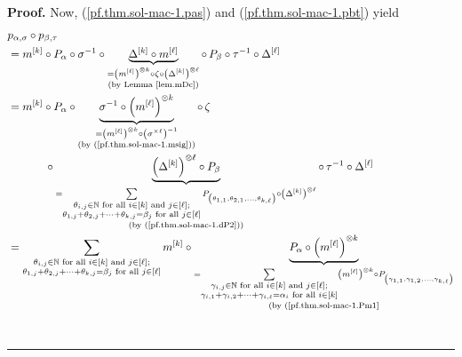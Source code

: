 \documentclass[numbers=enddot,12pt,final,onecolumn,notitlepage]{scrartcl}%
\theoremstyle{definition}
\newenvironment{proof}[1][Proof]{\noindent\textbf{#1.} }{\ \rule{0.5em}{0.5em}}
\let\sumnonlimits\sum
\renewcommand{\sum}{\sumnonlimits\limits}
\begin{document}
\begin{proof}
Now, (\ref{pf.thm.sol-mac-1.pas}) and (\ref{pf.thm.sol-mac-1.pbt}) yield%
\begin{align}
&  p_{\alpha,\sigma}\circ p_{\beta,\tau}\nonumber\\
&  =m^{\left[  k\right]  }\circ P_{\alpha}\circ\sigma^{-1}\circ
\underbrace{\Delta^{\left[  k\right]  }\circ m^{\left[  \ell\right]  }%
}_{\substack{=\left(  m^{\left[  \ell\right]  }\right)  ^{\otimes k}\circ
\zeta\circ\left(  \Delta^{\left[  k\right]  }\right)  ^{\otimes\ell
}\\\text{(by Lemma \ref{lem.mDc})}}}\circ\,P_{\beta}\circ\tau^{-1}\circ
\Delta^{\left[  \ell\right]  }\nonumber\\
&  =m^{\left[  k\right]  }\circ P_{\alpha}\circ\underbrace{\sigma^{-1}%
\circ\left(  m^{\left[  \ell\right]  }\right)  ^{\otimes k}}%
_{\substack{=\left(  m^{\left[  \ell\right]  }\right)  ^{\otimes k}%
\circ\left(  \sigma^{\times\ell}\right)  ^{-1}\\\text{(by
(\ref{pf.thm.sol-mac-1.msig}))}}}\circ\,\zeta\nonumber\\
&  \ \ \ \ \ \ \ \ \ \ \circ\underbrace{\left(  \Delta^{\left[  k\right]
}\right)  ^{\otimes\ell}\circ P_{\beta}}_{\substack{=\sum_{\substack{\theta
_{i,j}\in\mathbb{N}\text{ for all }i\in\left[  k\right]  \text{ and }%
j\in\left[  \ell\right]  ;\\\theta_{1,j}+\theta_{2,j}+\cdots+\theta
_{k,j}=\beta_{j}\text{ for all }j\in\left[  \ell\right]  }}P_{\left(
\theta_{1,1},\theta_{2,1},\ldots,\theta_{k,\ell}\right)  }\circ\left(
\Delta^{\left[  k\right]  }\right)  ^{\otimes\ell}\\\text{(by
(\ref{pf.thm.sol-mac-1.dP2}))}}}\circ\,\tau^{-1}\circ\Delta^{\left[
\ell\right]  }\nonumber\\
&  =\sum_{\substack{\theta_{i,j}\in\mathbb{N}\text{ for all }i\in\left[
k\right]  \text{ and }j\in\left[  \ell\right]  ;\\\theta_{1,j}+\theta
_{2,j}+\cdots+\theta_{k,j}=\beta_{j}\text{ for all }j\in\left[  \ell\right]
}}m^{\left[  k\right]  }\circ\underbrace{P_{\alpha}\circ\left(  m^{\left[
\ell\right]  }\right)  ^{\otimes k}}_{\substack{=\sum_{\substack{\gamma
_{i,j}\in\mathbb{N}\text{ for all }i\in\left[  k\right]  \text{ and }%
j\in\left[  \ell\right]  ;\\\gamma_{i,1}+\gamma_{i,2}+\cdots+\gamma_{i,\ell
}=\alpha_{i}\text{ for all }i\in\left[  k\right]  }}\left(  m^{\left[
\ell\right]  }\right)  ^{\otimes k}\circ P_{\left(  \gamma_{1,1},\gamma
_{1,2},\ldots,\gamma_{k,\ell}\right)  }\\\text{(by (\ref{pf.thm.sol-mac-1.Pm1}%
}}}
\end{align}
\end{proof}
\end{document}
